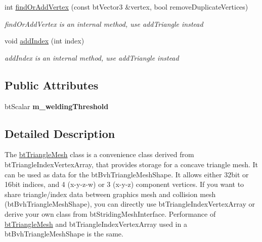 \begin{DoxyCompactItemize}
\item 
int \hyperlink{classbt_triangle_mesh_a3b521a1faa5862a818d9f983230749a2}{find\+Or\+Add\+Vertex} (const bt\+Vector3 \&vertex, bool remove\+Duplicate\+Vertices)
\begin{DoxyCompactList}\small\item\em find\+Or\+Add\+Vertex is an internal method, use add\+Triangle instead \end{DoxyCompactList}\item 
\hypertarget{classbt_triangle_mesh_aceefc2d4c6a9abaff3bd58310533fd8a}{void \hyperlink{classbt_triangle_mesh_aceefc2d4c6a9abaff3bd58310533fd8a}{add\+Index} (int index)}\label{classbt_triangle_mesh_aceefc2d4c6a9abaff3bd58310533fd8a}

\begin{DoxyCompactList}\small\item\em add\+Index is an internal method, use add\+Triangle instead \end{DoxyCompactList}\end{DoxyCompactItemize}
\subsection*{Public Attributes}
\begin{DoxyCompactItemize}
\item 
\hypertarget{classbt_triangle_mesh_a0b4be6aee36c84cb4d5679cde0ce91f8}{bt\+Scalar {\bfseries m\+\_\+welding\+Threshold}}\label{classbt_triangle_mesh_a0b4be6aee36c84cb4d5679cde0ce91f8}

\end{DoxyCompactItemize}


\subsection{Detailed Description}
The \hyperlink{classbt_triangle_mesh}{bt\+Triangle\+Mesh} class is a convenience class derived from bt\+Triangle\+Index\+Vertex\+Array, that provides storage for a concave triangle mesh. It can be used as data for the bt\+Bvh\+Triangle\+Mesh\+Shape. It allows either 32bit or 16bit indices, and 4 (x-\/y-\/z-\/w) or 3 (x-\/y-\/z) component vertices. If you want to share triangle/index data between graphics mesh and collision mesh (bt\+Bvh\+Triangle\+Mesh\+Shape), you can directly use bt\+Triangle\+Index\+Vertex\+Array or derive your own class from bt\+Striding\+Mesh\+Interface. Performance of \hyperlink{classbt_triangle_mesh}{bt\+Triangle\+Mesh} and bt\+Triangle\+Index\+Vertex\+Array used in a bt\+Bvh\+Triangle\+Mesh\+Shape is the same. 

